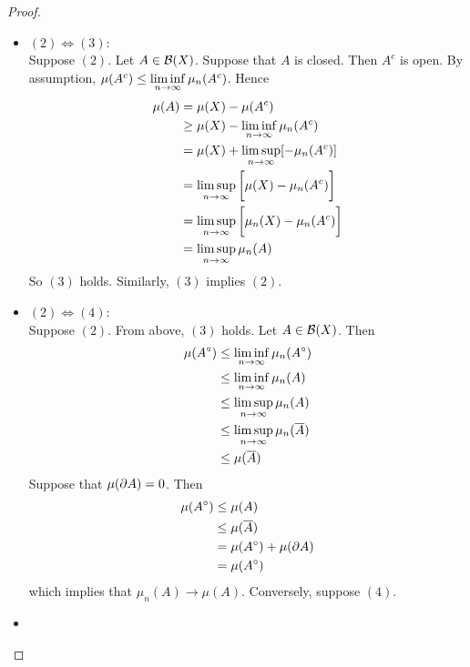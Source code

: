 \documentclass{book}
\begin{document}
	\begin{proof}\
		\begin{itemize}
			\item $(2) \iff (3)$: \\
			Suppose $(2)$. Let $A \in \mathcal{B}(X)$. Suppose that $A$ is closed. Then $A^c$ is open. By assumption, $\mu(A^c) \leq \liminf \limits_{n \rightarrow \infty} \limits \mu_n(A^c)$. Hence 
			\begin{align*}
				\mu(A)
				&= \mu(X) - \mu(A^c) \\
				&\geq \mu(X) - \liminf \limits_{n \rightarrow \infty} \mu_n(A^c) \\
				&= \mu(X) + \limsup \limits_{n \rightarrow \infty} [- \mu_n(A^c)] \\
				&= \limsup \limits_{n \rightarrow \infty} \bigg[ \mu(X)  - \mu_n(A^c) \bigg] \\
				&= \limsup \limits_{n \rightarrow \infty} \bigg[ \mu_n(X)  - \mu_n(A^c) \bigg] \\
				&= \limsup \limits_{n \rightarrow \infty} \mu_n(A)
			\end{align*}
			So $(3)$ holds.
			Similarly, $(3)$ implies $(2)$.\\
			\item $(2) \iff (4)$: \\
			Suppose $(2)$. From above, $(3)$ holds. Let $A \in \mathcal{B}(X)$. Then 
			\begin{align*}
				\mu(A^{\circ}) 
				& \leq \liminf \limits_{n \rightarrow \infty} \mu_n(A^{\circ}) \\
				& \leq  \liminf \limits_{n \rightarrow \infty} \mu_n(A) \\
				& \leq  \limsup \limits_{n \rightarrow \infty} \mu_n(A) \\
				& \leq  \limsup \limits_{n \rightarrow \infty} \mu_n(\overline{A}) \\
				& \leq  \mu(\overline{A}) \\
			\end{align*}
			Suppose that $\mu(\partial A) = 0$. Then
			\begin{align*}
				\mu(A^{\circ}) 
				&\leq \mu(A) \\
				& \leq \mu(\overline{A}) \\
				&= \mu(A^{\circ}) + \mu(\partial A) \\
				&= \mu(A^{\circ}) \\
			\end{align*}
			which implies that $\mu_n(A) \rightarrow \mu(A)$. Conversely, suppose $(4)$. 
			\item 
		\end{itemize}
	\end{proof}


	
	
	
	
	
	
\end{document}
